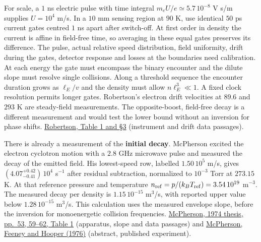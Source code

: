 \documentclass[11pt,a4paper]{article}
\begin{document}
For scale, a \(1\) ns electric pulse with time integral
\(m_eU/e\simeq5.7\,10^{-8}\) V s/m supplies \(U=10^4\) m/s. In a \(10\)
mm sensing region at \(90\) K, use identical \(50\) ps current gates
centred \(1\) ns apart after switch-off. At first order in density the
current is affine in field-free time, so averaging in these equal gates
preserves its difference. The pulse, actual relative speed distribution,
field uniformity, drift during the gates, detector response and losses
at the boundaries need calibration. At each energy the gate must
encompass the binary encounter and the dilute slope must resolve single
collisions. Along a threshold sequence the encounter duration grows as
\(\ell_E/v\) and the density must allow \(n\ell_E^3\ll1\). A fixed clock
resolution permits longer gates. Robertson's electron drift velocities
at \(89.6\) and \(293\) K are steady-field measurements. The
opposite-boost, field-free decay is a different measurement and would
test the lower bound without an inversion for phase shifts.
\href{https://www.publish.csiro.au/ph/pdf/PH770039}{Robertson, Table 1
and §3} (instrument and drift data passages).

There is already a measurement of the \textbf{initial decay}. McPherson
excited the electron cyclotron motion with a \(2.8\) GHz microwave pulse
and measured the decay of the emitted field. His lowest-speed row,
labelled \(1.50\,10^5\) m/s, gives \((4.07^{+0.42}_{-0.41})\,10^4\)
s\(^{-1}\) after residual subtraction, normalized to \(10^{-3}\) Torr at
\(273.15\) K. At that reference pressure and temperature
\(n_{\rm ref}=p/(k_BT_{\rm ref})=3.54\,10^{19}\) m\(^{-3}\). The
measured decay per density is \(1.15\,10^{-15}\) m\(^3\)/s, with
reported upper value below \(1.28\,10^{-15}\) m\(^3\)/s. This
calculation uses the measured envelope slope, before the inversion for
monoenergetic collision frequencies.
\href{https://repository.gatech.edu/bitstreams/b6e6ee45-e4b3-49d9-b1a8-492a589e7bee/download}{McPherson,
1974 thesis, pp.~53, 59--62, Table 1} (apparatus, slope and data
passages) and \href{https://doi.org/10.1103/PhysRevA.13.167}{McPherson,
Feeney and Hooper (1976)} (abstract, published experiment).
\end{document}
